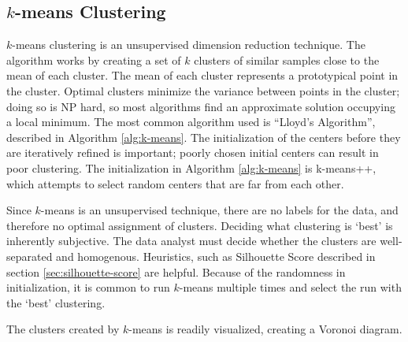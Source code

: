 \documentclass[11pt]{amsart}
\begin{document}
\subsection*{\(k\)-means Clustering}\label{sec:k-means}

\(k\)-means clustering is an unsupervised dimension reduction technique. The
algorithm works by creating a set of \(k\) clusters of similar samples close to
the mean of each cluster. The mean of each cluster represents a prototypical
point in the cluster. Optimal clusters minimize the variance between points in
the cluster; doing so is NP hard, so most algorithms find an approximate
solution occupying a local minimum. The most common algorithm used is ``Lloyd's
Algorithm'', described in Algorithm \ref{alg:k-means}. The initialization of the
centers before they are iteratively refined is important; poorly chosen initial
centers can result in poor clustering. The initialization in Algorithm
\ref{alg:k-means} is k-means++, which attempts to select random centers that are
far from each other.

Since \(k\)-means is an unsupervised technique, there are no labels for the
data, and therefore no optimal assignment of clusters. Deciding what clustering
is `best' is inherently subjective. The data analyst must decide whether the
clusters are well-separated and homogenous. Heuristics, such as Silhouette Score
described in section \ref{sec:silhouette-score} are helpful. Because of the
randomness in initialization, it is common to run \(k\)-means multiple times and
select the run with the `best' clustering.

The clusters created by \(k\)-means is readily visualized, creating a Voronoi diagram.
\end{document}
